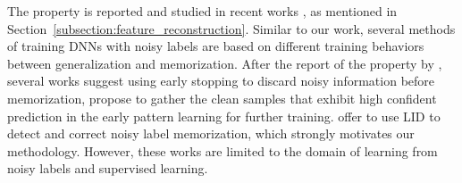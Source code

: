 \documentclass{article}
\begin{document}
The property is reported and studied in recent works \cite{ArpitL17, Lampinen19, stephenson21}, as mentioned in Section~\ref{subsection:feature_reconstruction}. 
Similar to our work, several methods of training DNNs with noisy labels are based on different training behaviors between generalization and memorization.
After the report of the property by \citet{ArpitL17}, several works \cite{hendrycks2019using, oymak2019generalization, song2020prestopping} suggest using early stopping to discard noisy information before memorization, \citet{jiang2018mentornet, yu2019does, sugiyama2018co} propose to gather the clean samples that exhibit high confident prediction in the early pattern learning for further training.
\citet{Ma18b} offer to use LID to detect and correct noisy label memorization, which strongly motivates our methodology.
However, these works are limited to the domain of learning from noisy labels and supervised learning.
\end{document}
